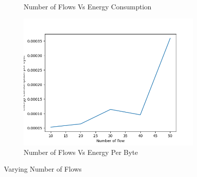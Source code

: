 \begin{figure}[h]
\begin{subfigure}{.5\textwidth}
     \caption{Number of Flows Vs Energy Consumption}
     \label{flow_energy}
\end{subfigure}
\begin{subfigure}{.5\textwidth}
  \centering
  \includegraphics[width=.8\linewidth]{_15_4_static/NumberofFlowvsEnergyConsumptionperByte.png}
     \caption{Number of Flows Vs Energy Per Byte}
     \label{flow_energy_per_byte}
\end{subfigure}
\caption{Varying Number of Flows}
\label{fig:varyingFlow}
\end{figure}
